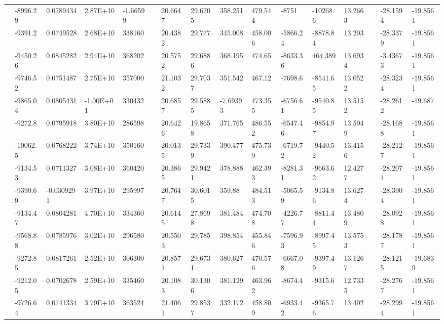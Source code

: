 \documentclass[paper=a4, fontsize=11pt]{scrartcl}
\numberwithin{equation}{section}
\numberwithin{figure}{section}
\numberwithin{table}{section}
\begin{document}
{{\begin{tabular}{l || l | l | l | l | l | l | l | l | l | l | l | l | l | l | l}
    & -8996.29 & 0.0789434 & 2.87E+10 & -1.66599 &  & 20.6647 & 29.6205 & 358.251 & 479.544 & -8751 & -10268.6 & 13.2663 &  & -28.1594 & -19.8561 \\
    & -9391.2 & 0.0749528 & 2.68E+10 & 338160 &  & 20.4382 & 29.777 & 345.008 & 458.006 & -5866.24 & -8878.84 & 13.203 &  & -28.3379 & -19.8561 \\
    & -9450.26 & 0.0845282 & 2.94E+10 & 368202 &  & 20.5752 & 29.6886 & 368.195 & 474.65 & -8633.36 & 464.389 & 13.6934 &  & -3.43673 & -19.8561 \\
    & -9746.52 & 0.0751487 & 2.75E+10 & 357000 &  & 21.1032 & 29.7037 & 351.542 & 467.12 & -7698.6 & -8541.65 & 13.0522 &  & -28.3234 & -19.8561 \\
    & -9865.04 & 0.0805431 & -1.00E+01 & 330432 &  & 20.6857 & 29.5885 & -7.69393 & 473.355 & -6756.61 & -9540.85 & 13.5152 &  & -28.2612 & -19.687 \\
    & -9272.8 & 0.0795918 & 3.80E+10 & 286598 &  & 20.6426 & 19.8658 & 371.765 & 486.552 & -6547.46 & -9854.97 & 13.5049 &  & -28.1688 & -19.8561 \\
    & -10062.5 & 0.0768222 & 3.74E+10 & 350160 &  & 20.0135 & 29.7339 & 390.477 & 475.739 & -6719.72 & -9440.52 & 13.4156 &  & -28.2127 & -19.8561 \\
    & -9134.53 & 0.0711327 & 3.08E+10 & 360420 &  & 20.3865 & 29.9421 & 378.888 & 462.393 & -8281.31 & -9663.62 & 12.4277 &  & -28.2074 & -19.8561 \\
    & -9390.69 & -0.0309291 & 3.97E+10 & 295997 &  & 20.7647 & 30.6015 & 359.88 & 484.513 & -5065.59 & -9134.86 & 13.6274 &  & -28.3904 & -19.8561 \\
    & -9134.47 & 0.0804281 & 4.70E+10 & 334360 &  & 20.6145 & 27.8698 & 381.484 & 474.708 & -4226.77 & -8811.44 & 13.4809 &  & -28.0928 & -19.8561 \\
    & -9568.88 & 0.0785976 & 3.02E+10 & 296580 &  & 20.5503 & 29.785 & 398.854 & 455.846 & -7596.93 & -8997.45 & 13.5753 &  & -28.1787 & -19.8561 \\
    & -9272.85 & 0.0817261 & 2.52E+10 & 306300 &  & 20.8571 & 29.6731 & 380.627 & 470.576 & -6667.08 & -9397.49 & 13.1267 &  & -28.1215 & -19.6839 \\
    & -9212.05 & 0.0702678 & 2.59E+10 & 335460 &  & 20.1083 & 30.1306 & 381.129 & 463.962 & -8674.4 & -9315.6 & 12.7335 &  & -28.2767 & -19.8561 \\
    & -9726.64 & 0.0741334 & 3.79E+10 & 363524 &  & 21.4061 & 29.8537 & 332.172 & 458.809 & -6933.42 & -9365.76 & 13.402 &  & -28.2994 & -19.8561 \\

\end{tabular}}}
\end{document}
